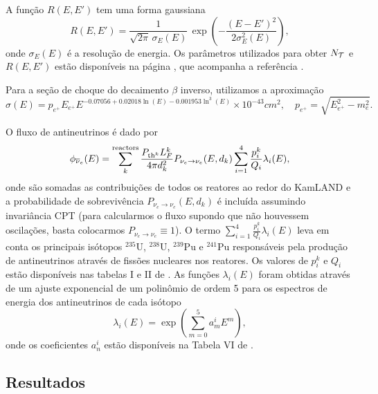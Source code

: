 \documentclass[12pt]{report}
\begin{document}
A função $R(E, E')$ tem uma forma gaussiana \cite{juno}
\begin{equation} \label{eq:resol_func}
R(E, E') = \frac{1}{\sqrt{2\pi} \, \sigma_E(E)} \,
\exp(-\frac{(E-E')^2}{2 \sigma_E^2(E)}),
\end{equation}
onde $\sigma_E(E)$ é a resolução de energia. Os parâmetros utilizados para obter $N_{\mathcal{T}}$ e $R(E, E')$ estão disponíveis na página \cite{kamland-data}, que acompanha a referência \cite{spectral-distortion}.

Para a seção de choque do decaimento $\beta$ inverso, utilizamos a aproximação \cite{cross-sec}
\begin{equation} \label{eq:cross-sec}
\sigma(E) = p_{e^+} E_{e^+}
E^{-0.07056 + 0.02018 \ln(E) - 0.001953 \ln^3(E)}
\times 10^{-43} \unit{cm^2}, \quad
p_{e^+} = \sqrt{E_{e^+}^2 - m_e^2}.
\end{equation}

O fluxo de antineutrinos é dado por \cite{refmodel}
\begin{equation} \label{eq:flux}
\phi_{\overline{\nu}_e}(E) =
\sum_{k}^{\text{reactors}} \frac{P_{\text{th}^k} L_F^k}{4 \pi d_k^2}
P_{\nu_e \to \nu_e}(E, d_k)
\sum_{i = 1}^{4} \frac{p_i^k}{Q_i} \lambda_i(E),
\end{equation}
onde são somadas as contribuições de todos os reatores ao redor do KamLAND e a probabilidade de sobrevivência $P_{\nu_e \to \nu_e}(E, d_k)$ é incluída assumindo invariância CPT (para calcularmos o fluxo supondo que não houvessem oscilações, basta colocarmos $P_{\nu_e \to \nu_e} \equiv 1$). O termo $\sum_{i = 1}^{4} \frac{p_i^k}{Q_i} \lambda_i(E)$ leva em conta os principais isótopos $^{235} \text{U}$, $^{238} \text{U}$, $^{239} \text{Pu}$ e $^{241} \text{Pu}$ responsáveis pela produção de antineutrinos através de fissões nucleares nos reatores. Os valores de $p_i^k$ e $Q_i$ estão disponíveis nas tabelas I e II de \cite{refmodel}. As funções $\lambda_i(E)$ foram obtidas através de um ajuste exponencial de um polinômio de ordem 5 para os espectros de energia dos antineutrinos de cada isótopo \cite{mueller}
\begin{equation} \label{eq:lambda}
\lambda_i(E) = \exp(\sum_{m=0}^{5} a_m^i E^m),
\end{equation}
onde os coeficientes $a_n^i$ estão disponíveis na Tabela VI de \cite{mueller}.

\subsection{Resultados} \label{sec:kamland-results}
\end{document}
